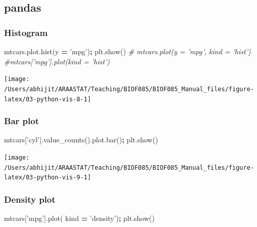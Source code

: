 \documentclass[
  letterpaper,
]{scrbook}
\newenvironment{Shaded}{\begin{snugshade}}{\end{snugshade}}
\newcommand{\CommentTok}[1]{\textcolor[rgb]{0.56,0.35,0.01}{\textit{#1}}}
\newcommand{\NormalTok}[1]{#1}
\newcommand{\OperatorTok}[1]{\textcolor[rgb]{0.81,0.36,0.00}{\textbf{#1}}}
\newcommand{\StringTok}[1]{\textcolor[rgb]{0.31,0.60,0.02}{#1}}
\begin{document}
\hypertarget{pandas-1}{%
\subsection{pandas}\label{pandas-1}}

\hypertarget{histogram}{%
\subsubsection{Histogram}\label{histogram}}

\begin{Shaded}
\begin{Highlighting}[]
\NormalTok{mtcars.plot.hist(y }\OperatorTok{=} \StringTok{'mpg'}\NormalTok{)}\OperatorTok{;}
\NormalTok{plt.show()}
\CommentTok{# mtcars.plot(y = 'mpg', kind = 'hist')}
\CommentTok{#mtcars['mpg'].plot(kind = 'hist')}
\end{Highlighting}
\end{Shaded}

\begin{center}\texttt{[image: /Users/abhijit/ARAASTAT/Teaching/BIOF085/BIOF085\_Manual\_files/figure-latex/03-python-vis-8-1]} \end{center}

\hypertarget{bar-plot}{%
\subsubsection{Bar plot}\label{bar-plot}}

\begin{Shaded}
\begin{Highlighting}[]
\NormalTok{mtcars[}\StringTok{'cyl'}\NormalTok{].value_counts().plot.bar()}\OperatorTok{;}
\NormalTok{plt.show()}
\end{Highlighting}
\end{Shaded}

\begin{center}\texttt{[image: /Users/abhijit/ARAASTAT/Teaching/BIOF085/BIOF085\_Manual\_files/figure-latex/03-python-vis-9-1]} \end{center}

\hypertarget{density-plot}{%
\subsubsection{Density plot}\label{density-plot}}

\begin{Shaded}
\begin{Highlighting}[]
\NormalTok{mtcars[}\StringTok{'mpg'}\NormalTok{].plot( kind }\OperatorTok{=} \StringTok{'density'}\NormalTok{)}\OperatorTok{;}
\NormalTok{plt.show()}
\end{Highlighting}
\end{Shaded}
\end{document}
